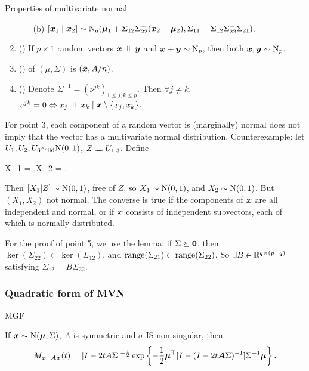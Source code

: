 \documentclass[10pt,a4paper]{book}
\begin{document}
\begin{thmbox}{Properties of multivariate normal}
\begin{theorem}
\begin{enumerate}
\begin{itemize}
				\item[(b)] $[{\boldsymbol x}_1\mid{\boldsymbol x}_2]\sim\mathrm{N}_q({\boldsymbol\mu}_1+{\Sigma}_{12}{\Sigma}_{22}^-({\boldsymbol x}_2-{\boldsymbol\mu}_2),\Sigma_{11}-\Sigma_{12}\Sigma_{22}^{-}\Sigma_{21})$. 
			\end{itemize}  
			\item () If $p\times 1$ random vectors $\x\indep \y$ and ${\boldsymbol x}+{\boldsymbol y}\sim\mathrm{N}_p$, then both ${\boldsymbol x},{\boldsymbol y}\sim\mathrm{N}_p$. 
			\item () of $(\mu,\Sigma)$ is $(\bar{{\boldsymbol x}},A/n)$.    
			\item () Denote $\Sigma^{-1}=(\nu^{jk})_{1\leq j,k\leq p}$. Then $\forall j\neq k$, $v^{jk}=0\Leftrightarrow  x_j\indep x_k \mid \x\setminus\{x_j,x_k\}$.    
		\end{enumerate} 
	\end{theorem}
\end{thmbox}
For point 3, each component of a random vector is (marginally) normal does not imply that the vector has a multivariate normal distribution. Counterexample: let $U_1,U_2,U_3{\sim}_{\mathrm{iid}}\mathrm{N}(0,1)$, $Z\indep U_{1:3}$. Define 
\begin{sequation*}
	X_1 = ,\quad X_2 = .
\end{sequation*}   
Then $[X_1|Z]\sim\mathrm{N}(0,1)$, free of $Z$, so $X_1\sim\mathrm{N}(0,1)$, and $X_2\sim\mathrm{N}(0,1)$. But $(X_1,X_2)$ not normal.
The converse is true if the components of ${\boldsymbol x}$ are all independent and normal, or if ${\boldsymbol x}$ consists of independent subvectors, each of which is normally distributed.

For the proof of point 5, we use the lemma: if $\Sigma\succeq {\boldsymbol 0}$, 
then $\ker(\Sigma_{22})\subset \ker(\Sigma_{12})$, and $\mathrm{range}(\Sigma_{21})\subset\mathrm{range}(\Sigma_{22})$. 
So $\exists B\in\mathbb R^{q\times(p-q)}$ satisfying $\Sigma_{12}=B\Sigma_{22}$.  

\subsubsection{Quadratic form of MVN}\label{sec:quad_MVN}
\begin{thmbox}{MGF}
	\begin{proposition}\label{prop:MVN_MGF_quad}
		If ${\boldsymbol x}\sim\mathrm{N}({\boldsymbol\mu},\Sigma)$, $A$ is symmetric and $\sigma$ IS non-singular, then 
		\begin{equation*}
			M_{{\boldsymbol x}^\top{\boldsymbol A}{\boldsymbol x}}(t)=|I-2tA\Sigma|^{-\frac{1}{2}}\exp\left\{ {-\frac{1}{2}{\boldsymbol\mu}^\top[I-(I-2t{\boldsymbol A}\Sigma)^{-1}]{\Sigma}^{-1}{\boldsymbol\mu}}\right\}.
		\end{equation*}
	\end{proposition}
\end{thmbox}
\end{document}
